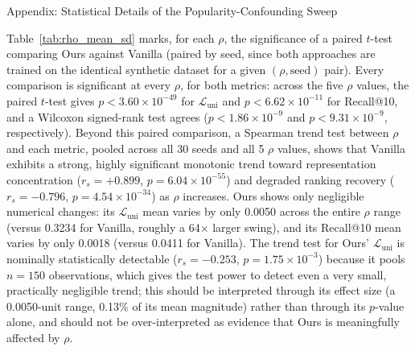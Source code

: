 Appendix: Statistical Details of the Popularity-Confounding Sweep

Table~\ref{tab:rho_mean_sd} marks, for each $\rho$, the significance of a paired $t$-test comparing Ours against Vanilla (paired by seed, since both approaches are trained on the identical synthetic dataset for a given $(\rho,\text{seed})$ pair). Every comparison is significant at every $\rho$, for both metrics: across the five $\rho$ values, the paired $t$-test gives $p<3.60\times10^{-49}$ for $\mathcal{L}_{\mathrm{uni}}$ and $p<6.62\times10^{-11}$ for Recall@10, and a Wilcoxon signed-rank test agrees ($p<1.86\times10^{-9}$ and $p<9.31\times10^{-9}$, respectively). Beyond this paired comparison, a Spearman trend test between $\rho$ and each metric, pooled across all 30 seeds and all 5 $\rho$ values, shows that Vanilla exhibits a strong, highly significant monotonic trend toward representation concentration ($r_s=+0.899$, $p=6.04\times10^{-55}$) and degraded ranking recovery ($r_s=-0.796$, $p=4.54\times10^{-34}$) as $\rho$ increases. Ours shows only negligible numerical changes: its $\mathcal{L}_{\mathrm{uni}}$ mean varies by only 0.0050 across the entire $\rho$ range (versus 0.3234 for Vanilla, roughly a 64$\times$ larger swing), and its Recall@10 mean varies by only 0.0018 (versus 0.0411 for Vanilla). The trend test for Ours' $\mathcal{L}_{\mathrm{uni}}$ is nominally statistically detectable ($r_s=-0.253$, $p=1.75\times10^{-3}$) because it pools $n=150$ observations, which gives the test power to detect even a very small, practically negligible trend; this should be interpreted through its effect size (a 0.0050-unit range, 0.13\% of its mean magnitude) rather than through its $p$-value alone, and should not be over-interpreted as evidence that Ours is meaningfully affected by $\rho$.
